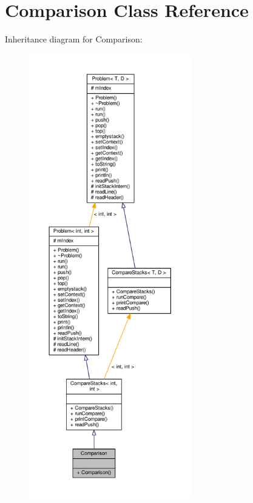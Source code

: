 \hypertarget{class_comparison}{}\section{Comparison Class Reference}
\label{class_comparison}


Inheritance diagram for Comparison\+:
\nopagebreak
\begin{figure}[H]
\begin{center}
\leavevmode
\includegraphics[height=550pt]{class_comparison__inherit__graph}
\end{center}
\end{figure}



